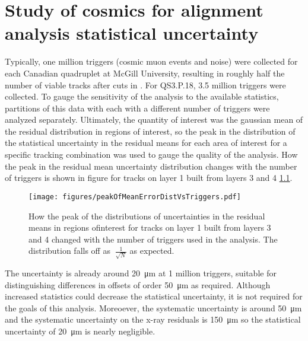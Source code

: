 
\chapter[Analysis statistics]{Study of cosmics for alignment analysis statistical uncertainty}
\label{appendix:statistics}


Typically, one million triggers (cosmic muon events and noise) were collected for each Canadian quadruplet at McGill University, resulting in roughly half the number of viable tracks after cuts in . For QS3.P.18, 3.5 million triggers were collected. To gauge the sensitivity of the analysis to the available statistics, partitions of this data with each with a different number of triggers were analyzed separately. Ultimately, the quantity of interest was the gaussian mean of the residual distribution in regions of interest, so the peak in the distribution of the statistical uncertainty in the residual means for each area of interest for a specific tracking combination was used to gauge the quality of the analysis. How the peak in the residual mean uncertainty distribution changes with the number of triggers is shown in figure for tracks on layer 1 built from layers 3 and 4 \ref{fig:res_mean_uncert_vs_triggers}. 

\begin{figure}
    \centering
    \texttt{[image: figures/peakOfMeanErrorDistVsTriggers.pdf]}
    \caption{How the peak of the distributions of uncertainties in the residual means in regions ofinterest for tracks on layer 1 built from layers 3 and 4 changed with the number of triggers used in the analysis. The distribution falls off as $~\frac{1}{\sqrt{N}}$ as expected.}
    \label{fig:res_mean_uncert_vs_triggers}
\end{figure}

The uncertainty is already around \SI{20}{\micro\meter} at 1 million triggers, suitable for distinguishing differences in offsets of order \SI{50}{\micro\meter} as required. Although increased statistics could decrease the statistical uncertainty, it is not required for the goals of this analysis. Moreoever, the systematic uncertainty is around \SI{50}{\micro\meter} and the systematic uncertainty on the x-ray residuals is \SI{150}{\micro\meter} so the statistical uncertainty of \SI{20}{\micro\meter} is nearly negligible.

